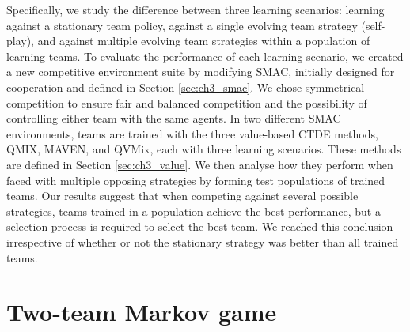 Specifically, we study the difference between three learning scenarios: learning against a stationary team policy, against a single evolving team strategy (self-play), and against multiple evolving team strategies within a population of learning teams.
To evaluate the performance of each learning scenario, we created a new competitive environment suite by modifying SMAC, initially designed for cooperation and defined in Section \ref{sec:ch3_smac}.
We chose symmetrical competition to ensure fair and balanced competition and the possibility of controlling either team with the same agents.
In two different SMAC environments, teams are trained with the three value-based CTDE methods, QMIX, MAVEN, and QVMix, each with three learning scenarios.
These methods are defined in Section \ref{sec:ch3_value}.
We then analyse how they perform when faced with multiple opposing strategies by forming test populations of trained teams.
Our results suggest that when competing against several possible strategies, teams trained in a population achieve the best performance, but a selection process is required to select the best team.
We reached this conclusion irrespective of whether or not the stationary strategy was better than all trained teams.

\section{Two-team Markov game}\label{sec:ch7_2teammarkov}

